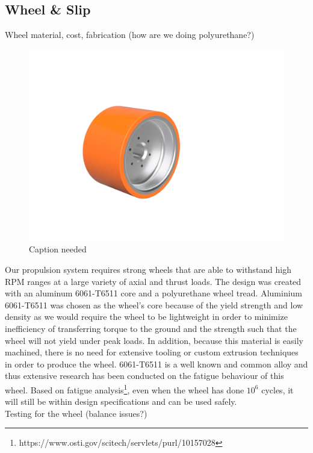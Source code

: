\documentclass{report}
\begin{document}
    \subsection{Wheel \& Slip}
    Wheel material, cost, fabrication (how are we doing polyurethane?)
    \begin{figure}[H]
        \centering
        \includegraphics[width=\linewidth]{images/fig19}
        \caption{Caption needed}
    \end{figure}
    Our propulsion system requires strong wheels that are able to withstand high RPM ranges at a large variety of axial and thrust loads. The design was created with an aluminum 6061-T6511 core and a polyurethane wheel tread. Aluminium 6061-T6511 was chosen as the wheel’s core because of the yield strength and low density as we would require the wheel to be lightweight in order to minimize inefficiency of transferring torque to the ground and the strength such that the wheel will not yield under peak loads. In addition, because this material is easily machined, there is no need for extensive tooling or custom extrusion techniques in order to produce the wheel. 6061-T6511 is a well known and common alloy and thus extensive research has been conducted on the fatigue behaviour of this wheel. Based on fatigue analysis\footnote{ https://www.osti.gov/scitech/servlets/purl/10157028}, even when the wheel has done $10^6$ cycles, it will still be within design specifications and can be used safely.\\
    
    Testing for the wheel (balance issues?)
    
\end{document}
